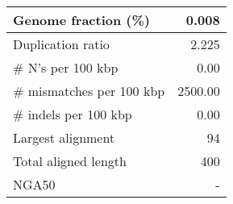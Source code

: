 \documentclass[12pt,a4paper]{article}
\begin{document}
\begin{table}[ht]
\begin{center}
\begin{tabular}{|l*{1}{|r}|}
Genome fraction (\%) & 0.008 \\ \hline
Duplication ratio & 2.225 \\ \hline
\# N's per 100 kbp & 0.00 \\ \hline
\# mismatches per 100 kbp & 2500.00 \\ \hline
\# indels per 100 kbp & 0.00 \\ \hline
Largest alignment & 94 \\ \hline
Total aligned length & 400 \\ \hline
NGA50 & - \\ \hline
\end{tabular}
\end{center}
\end{table}
\end{document}
